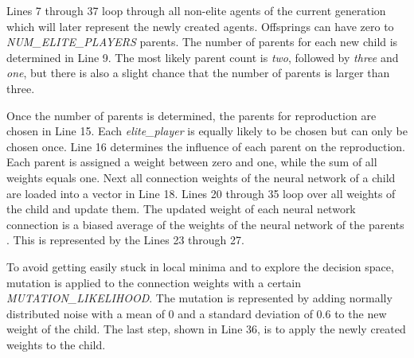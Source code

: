 Lines 7 through 37 loop through all non-elite agents of the current generation which will later represent the newly created agents. Offsprings can have zero to \textit{NUM\_ELITE\_PLAYERS} parents. The number of parents for each new child is determined in Line 9. The most likely parent count is \textit{two}, followed by \textit{three} and \textit{one}, but there is also a slight chance that the number of parents is larger than three.\par
Once the number of parents is determined, the parents for reproduction are chosen in Line 15. Each \textit{elite\_player} is equally likely to be chosen but can only be chosen once. Line 16 determines the influence of each parent on the reproduction. Each parent is assigned a weight between zero and one, while the sum of all weights equals one. Next all connection weights of the neural network of a child are loaded into a vector in Line 18. Lines 20 through 35 loop over all weights of the child and update them. The updated weight of each neural network connection is a biased average of the weights of the neural network of the parents \cite{evolutionary_methods}. This is represented by the Lines 23 through 27.\par
To avoid getting easily stuck in local minima and to explore the decision space, mutation is applied to the connection weights with a certain \textit{MUTATION\_LIKELIHOOD}. The mutation is represented by adding normally distributed noise with a mean of 0 and a standard deviation of 0.6 to the new weight of the child. The last step, shown in Line 36, is to apply the newly created weights to the child.

